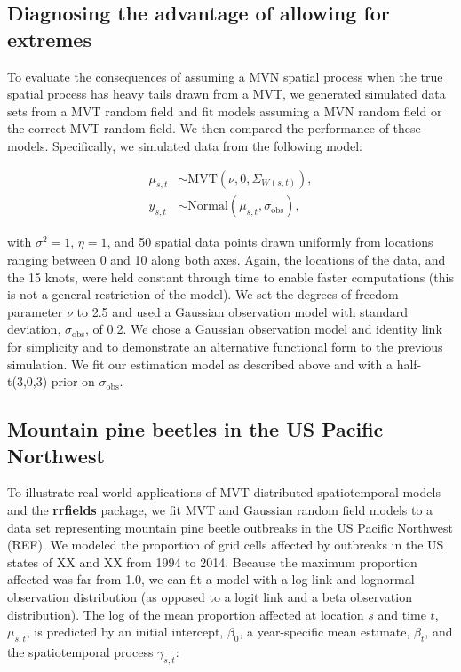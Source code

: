 \documentclass[12pt,english]{article}
\begin{document}
\begin{spacing}{1.25}
\subsection{Diagnosing the advantage of allowing for extremes}

To evaluate the consequences of assuming a MVN spatial process when the
true spatial process has heavy tails drawn from a MVT, we generated simulated
data sets from a MVT random field and fit models assuming a
MVN random field or the
correct MVT random field.
We then compared the performance of these models. Specifically, we
simulated data from the following model:

\begin{align}
  \mu_{s,t} &\sim \mathrm{MVT}\left(\nu, 0, \Sigma_{W(s,t)}\right),\\
  y_{s,t} &\sim \mathrm{Normal} \left(\mu_{s,t}, \sigma_{\mathrm{obs}} \right),
\end{align}

\noindent with $\sigma^2 = 1$, $\eta = 1$, and 50 spatial data points drawn uniformly
from locations ranging between 0 and 10 along both axes. Again, the locations
of the data, and the 15 knots, were held constant through time to enable faster
computations (this is not a general restriction of the model).
We set the degrees of freedom parameter $\nu$ to 2.5 and used a
Gaussian observation model with standard deviation, $\sigma_{\mathrm{obs}}$, of
0.2. We chose a Gaussian observation
model and identity link for simplicity and to demonstrate an alternative
functional form to the previous simulation. We fit our estimation model as
described above and with a half-t(3,0,3) prior on $\sigma_{\mathrm{obs}}$.

\subsection{Mountain pine beetles in the US Pacific Northwest}

To illustrate real-world applications of MVT-distributed
spatiotemporal models and the \textbf{rrfields} package,
we fit MVT and Gaussian random field models
to a data set representing
mountain pine beetle outbreaks in the
US Pacific Northwest (REF). We modeled the
proportion of grid cells affected by outbreaks
in the US states of XX and XX from 1994 to 2014.
Because the maximum proportion affected was far from 1.0, we
can fit a model with a log link and lognormal observation distribution
(as opposed to a logit link and a beta observation distribution).
The log of the mean proportion affected at location $s$ and time $t$, $\mu_{s,t}$,
is predicted by an initial intercept, $\beta_0$, a year-specific mean estimate, $\beta_t$,
and the spatiotemporal process $\gamma_{s,t}$:


\end{spacing}
\end{document}
